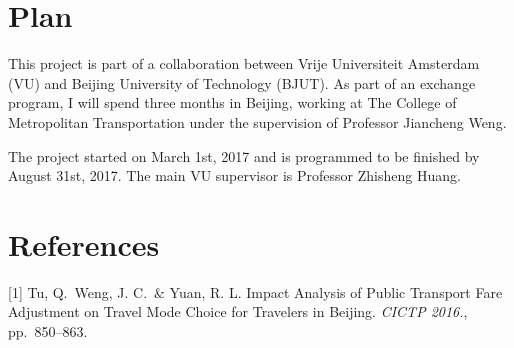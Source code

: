 \documentclass{article}
\begin{document}
\section{Plan}
This project is part of a collaboration between Vrije Universiteit Amsterdam (VU) and Beijing University of Technology (BJUT). As part of an exchange program, I will spend three months in Beijing, working at The College of Metropolitan Transportation under the supervision of Professor Jiancheng Weng. 

The project started on March 1st, 2017 and is programmed to be finished by August 31st, 2017. The main VU supervisor is Professor Zhisheng Huang. 

\section*{References}

\small

[1] Tu, Q.\ Weng, J. C.\ \& Yuan, R. L. Impact Analysis of Public Transport Fare Adjustment on Travel Mode Choice for Travelers in Beijing. {\it CICTP 2016.}, pp.\ 850--863.
\end{document}
